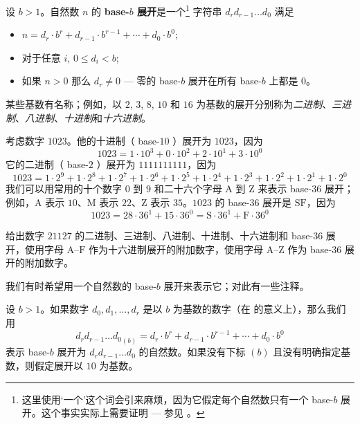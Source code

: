 \begin{definition}
\label{defBaseBExpansionPreliminary}
设 $b>1$。自然数 $n$ 的 \textbf{base-$b$ 展开}是一个\footnote{这里使用`一个'这个词会引来麻烦，因为它假定每个自然数只有一个 base-$b$ 展开。这个事实实际上需要证明 --- 参见 。} 字符串 $d_r d_{r-1} \dots d_0$ 满足
\begin{itemize}
\item $n = d_r \cdot b^r + d_{r-1} \cdot b^{r-1} + \cdots + d_0 \cdot b^0$;
\item 对于任意 $i$, $0 \le d_i < b$;
\item 如果 $n>0$ 那么 $d_r \ne 0$ --- 零的 base-$b$ 展开在所有 base-$b$ 上都是 $0$。
\end{itemize}
某些基数有名称；例如，以 $2$, $3$, $8$, $10$ 和 $16$ 为基数的展开分别称为\textit{二进制}、\textit{三进制}、\textit{八进制}、\textit{十进制}和\textit{十六进制}。
\end{definition}

\begin{example}
考虑数字 $1023$。他的十进制（ base-$10$ ）展开为 $1023$，因为
\[ 1023 = 1 \cdot 10^3 + 0 \cdot 10^2 + 2 \cdot 10^1 + 3 \cdot 10^0 \]
它的二进制（ base-$2$ ）展开为 $1111111111$，因为
\[ 1023 = 1 \cdot 2^9 + 1 \cdot 2^8 + 1 \cdot 2^7 + 1 \cdot 2^6 + 1 \cdot 2^5 + 1 \cdot 2^4 + 1 \cdot 2^3 + 1 \cdot 2^2 + 1 \cdot 2^1 + 1 \cdot 2^0 \]
我们可以用常用的十个数字 $0$ 到 $9$ 和二十六个字母 $\mathrm{A}$ 到 $\mathrm{Z}$ 来表示 base-$36$ 展开；例如，$\mathrm{A}$ 表示 $10$、$\mathrm{M}$ 表示 $22$、$\mathrm{Z}$ 表示 $35$。$1023$ 的 base-$36$ 展开是 $\mathrm{SF}$，因为
\[ 1023 = 28 \cdot 36^1 + 15 \cdot 36^0 = \mathrm{S} \cdot 36^1 + \mathrm{F} \cdot 36^0 \]
\end{example}

\begin{exercise}
给出数字 $21127$ 的二进制、三进制、八进制、十进制、十六进制和 base-$36$ 展开，使用字母 $\mathrm{A}$--$\mathrm{F}$ 作为十六进制展开的附加数字，使用字母 $\mathrm{A}$--$\mathrm{Z}$ 作为 base-$36$ 展开的附加数字。
\end{exercise}

我们有时希望用一个自然数的 base-$b$ 展开来表示它；对此有一些注释。

\begin{notation}
设 $b>1$。如果数字 $d_0,d_1,\dots,d_r$ 是以 $b$ 为基数的数字（在  的意义上），那么我们用
\[ {d_rd_{r-1} \dots d_0}_{(b)} = d_r \cdot b^r + d_{r-1} \cdot b^{r-1} + \cdots + d_0 \cdot b^0 \]
表示 base-$b$ 展开为 $d_rd_{r-1} \dots d_0$ 的自然数。如果没有下标 $(b)$ 且没有明确指定基数，则假定展开以 $10$ 为基数。
\end{notation}

